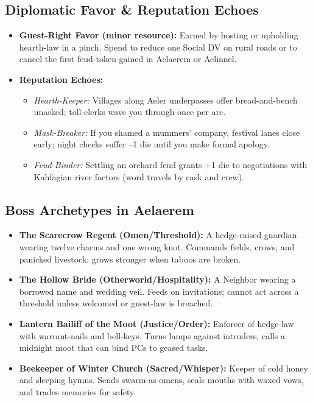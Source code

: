 \subsection*{Diplomatic Favor \& Reputation Echoes}
\begin{itemize}
  \item \textbf{Guest-Right Favor (minor resource):} Earned by hosting or upholding hearth-law in a pinch. Spend to reduce one Social DV on rural roads or to cancel the first feud-token gained in Aelaerem or Aelinnel.
  \item \textbf{Reputation Echoes:} 
    \begin{itemize}
      \item \emph{Hearth-Keeper:} Villages along Aeler underpasses offer bread-and-bench unasked; toll-clerks wave you through once per arc.
      \item \emph{Mask-Breaker:} If you shamed a mummers’ company, festival lanes close early; night checks suffer --1 die until you make formal apology.
      \item \emph{Feud-Binder:} Settling an orchard feud grants +1 die to negotiations with Kahfagian river factors (word travels by cask and crew).
    \end{itemize}
\end{itemize}

\subsection*{Boss Archetypes in Aelaerem}
\label{sec:aelaerem-bosses}

\begin{itemize}
  \item \textbf{The Scarecrow Regent (Omen/Threshold):} A hedge-raised guardian wearing twelve charms and one wrong knot. Commands fields, crows, and panicked livestock; grows stronger when taboos are broken.
  \item \textbf{The Hollow Bride (Otherworld/Hospitality):} A Neighbor wearing a borrowed name and wedding veil. Feeds on invitations; cannot act across a threshold unless welcomed or guest-law is breached.
  \item \textbf{Lantern Bailiff of the Moot (Justice/Order):} Enforcer of hedge-law with warrant-nails and bell-keys. Turns lamps against intruders, calls a midnight moot that can bind PCs to geased tasks.
  \item \textbf{Beekeeper of Winter Church (Sacred/Whisper):} Keeper of cold honey and sleeping hymns. Sends swarm-as-omens, seals mouths with waxed vows, and trades memories for safety.
\end{itemize}

